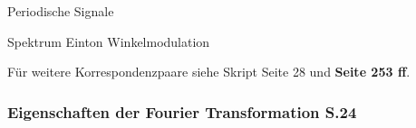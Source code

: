 \begin{minipage}{8cm}
	Periodische Signale
\end{minipage}

\begin{minipage}{15cm}
	Spektrum Einton Winkelmodulation
\end{minipage}

Für weitere Korrespondenzpaare siehe Skript Seite 28 und \textbf{Seite 253 ff}.

\subsubsection{Eigenschaften der Fourier Transformation S.24}
\renewcommand{\arraystretch}{2}
